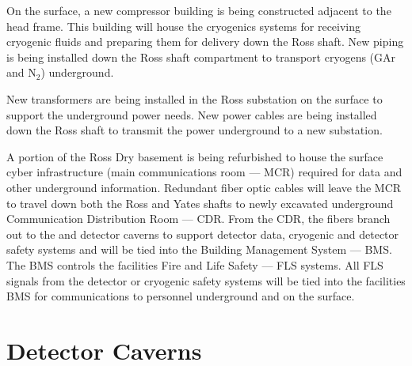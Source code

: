On the surface, a new compressor building is being constructed
adjacent to the head frame.  This building will house the cryogenics
systems for receiving cryogenic fluids and preparing them for delivery
down the Ross shaft.  New piping is being installed down the Ross
shaft compartment to transport cryogens (GAr and N$_2$) underground.

New transformers are being installed in the Ross substation on the
surface to support the underground power needs.  New power cables are
being installed down the Ross shaft to transmit the power underground
to a new substation.

A portion of the Ross Dry basement is being refurbished to house the
surface cyber infrastructure (main communications room --- MCR)
required for data and other underground information.  Redundant fiber
optic cables will leave the MCR to travel down both the Ross and Yates
shafts to newly excavated underground Communication Distribution Room
--- CDR.  From the CDR, the fibers branch out to the  and detector
caverns to support detector data, cryogenic and detector safety
systems and will be tied into the Building Management System --- BMS.
The BMS controls the facilities Fire and Life Safety --- FLS systems.
All FLS signals from the detector or cryogenic safety systems will be
tied into the facilities BMS for communications to personnel
underground and on the surface.

\section{Detector Caverns}
\label{sec:fdsp-coord-faci-caverns}


